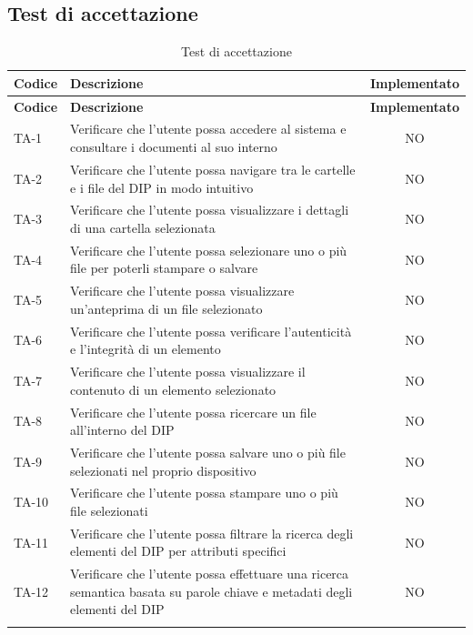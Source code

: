 \documentclass[a4paper,12pt]{article}
\begin{document}
\subsection{Test di accettazione}


\setlength{\LTleft}{0.9cm}
\renewcommand{\arraystretch}{1.2}
\begin{longtable}{|p{1.5cm}|p{8.5cm}|c|}
\hline
\rowcolor{zpusgreen!30}
\textbf{Codice} & \textbf{Descrizione} & \textbf{Implementato} \\
\hline
\endfirsthead
\rowcolor{zpusgreen!30}
\textbf{Codice} & \textbf{Descrizione} & \textbf{Implementato} \\
\hline
\endhead
TA-1 & Verificare che l'utente possa accedere al sistema e consultare i documenti al suo interno & NO \\
\hline
TA-2 & Verificare che l'utente possa navigare tra le cartelle e i file del DIP in modo intuitivo & NO \\
\hline
TA-3 & Verificare che l'utente possa visualizzare i dettagli di una cartella selezionata & NO \\
\hline
TA-4 & Verificare che l'utente possa selezionare uno o più file per poterli stampare o salvare & NO \\
\hline
TA-5 & Verificare che l'utente possa visualizzare un'anteprima di un file selezionato & NO \\
\hline
TA-6 & Verificare che l'utente possa verificare l'autenticità e l'integrità di un elemento & NO \\
\hline
TA-7 & Verificare che l'utente possa visualizzare il contenuto di un elemento selezionato & NO \\
\hline
TA-8 & Verificare che l'utente possa ricercare un file all'interno del DIP & NO \\
\hline
TA-9 & Verificare che l'utente possa salvare uno o più file selezionati nel proprio dispositivo & NO \\
\hline
TA-10 & Verificare che l'utente possa stampare uno o più file selezionati & NO \\
\hline
TA-11 & Verificare che l'utente possa filtrare la ricerca degli elementi del DIP per attributi specifici & NO \\
\hline
TA-12 & Verificare che l'utente possa effettuare una ricerca semantica basata su parole chiave e metadati degli elementi del DIP & NO \\
\hline
\rowcolor{white}
\caption{Test di accettazione}
\label{tab:test-accettazione}
\end{longtable}
\end{document}
